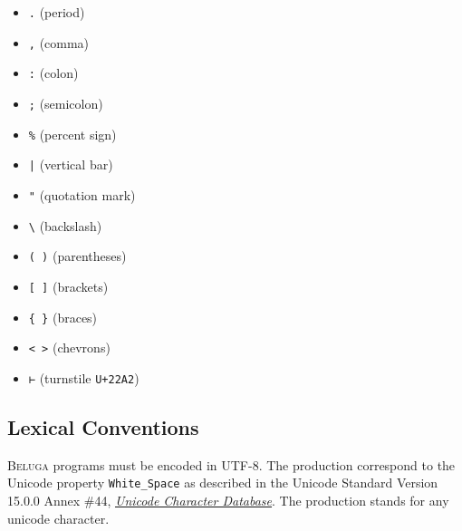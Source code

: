 \documentclass[11pt]{article}
\newcommand{\Beluga}{\textsc{Beluga}\xspace}
\begin{document}
{\setlength{\columnseprule}{0.4pt}
\begin{multicols}{3}
\begin{itemize}[label={}]
\item \texttt{.} \hfill (period)
\item \texttt{,} \hfill (comma)
\item \texttt{:} \hfill (colon)
\item \texttt{;} \hfill (semicolon)
\item \texttt{\%} \hfill (percent sign)
\item \texttt{|} \hfill (vertical bar)
\item \texttt{"} \hfill (quotation mark)
\item \texttt{\textbackslash} \hfill (backslash)
\item \texttt{( )} \hfill (parentheses)
\item \texttt{[ ]} \hfill (brackets)
\item \texttt{\{ \}} \hfill (braces)
\item \texttt{< >} \hfill (chevrons)
\item \texttt{⊢} \hfill (turnstile \texttt{U+22A2})
\end{itemize}
\end{multicols}
}

\subsection{Lexical Conventions}

\Beluga programs must be encoded in \textsc{UTF-8}.
The production  correspond to the Unicode property \texttt{White\_Space} as described in the Unicode Standard Version 15.0.0 Annex \#44, \href{https://www.unicode.org/reports/tr44/tr44-30.html#White_Space}{\textit{Unicode Character Database}}.
The production  stands for any unicode character.
\end{document}
